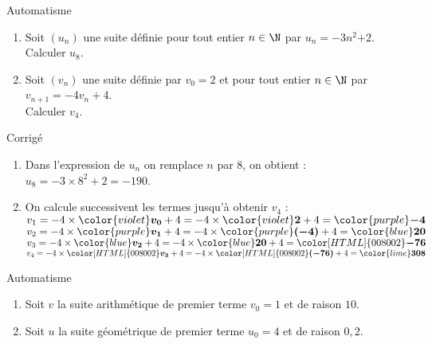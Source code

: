 \documentclass[a4paper,11pt,exos]{nsi} %
\newcounter{autNum}
\newcommand{\aut}[1]
{
	\addtocounter{autNum}{1}
	{\titlefont\color{UGLiBlue}\Large Automatisme\ \theautNum\ \normalsize{#1}}\smallskip	
}
\newcounter{corNum}
\newcommand{\cor}[1]
{
	\addtocounter{corNum}{1}
	{\titlefont\color{UGLiOrange}\Large Corrigé\ \thecorNum\ \normalsize{#1}}\smallskip	
}
\begin{document}
\vspace*{.5cm}
\aut{}
\begin{enumerate}
    \item Soit $(u_n)$ une suite définie pour tout entier $n\in\N$ par $u_n = -3n^2$$+2$.\\Calculer $u_{8}$.
    \item  Soit $(v_n)$ une suite définie par $v_0=2$ et pour tout entier $n\in\N$ par $v_{n+1} = -4 v_n +4$.\\Calculer $v_{4}$.
\end{enumerate}

\cor{}
\begin{enumerate}
    \item Dans l'expression de $u_n$ on remplace $n$ par $8$, on obtient : $u_{8} = -3\times 8^2+2=-190$.
    \item On calcule successivent les termes jusqu'à obtenir $v_4$ :\\ $v_{1} = -4\times {\color{violet}\boldsymbol{v_{0}}} +4=-4 \times {\color{violet}\boldsymbol{2}} +4 =
    {\color{purple}\boldsymbol{-4}}$\\ $v_{2} = -4\times {\color{purple}\boldsymbol{v_{1}}} +4=-4 \times {\color{purple}\boldsymbol{(-4)}} +4 =
    {\color{blue}\boldsymbol{20}}$\\ $v_{3} = -4\times {\color{blue}\boldsymbol{v_{2}}} +4=-4 \times {\color{blue}\boldsymbol{20}} +4 =
    {\color[HTML]{008002}\boldsymbol{-76}}$\\ $v_{4} = -4\times {\color[HTML]{008002}\boldsymbol{v_{3}}} +4=-4 \times {\color[HTML]{008002}\boldsymbol{(-76)}} +4 =
    {\color{lime}\boldsymbol{308}}$
\end{enumerate}

\vspace*{.5cm}
\aut{}
\begin{enumerate}
    \item Soit $v$ la suite arithmétique de premier terme $v_0 = 1$ et de raison $10$.
    \item Soit $u$ la suite géométrique de premier terme $u_0 = 4$ et de raison $0{,}2$.
\end{enumerate}
\end{document}
